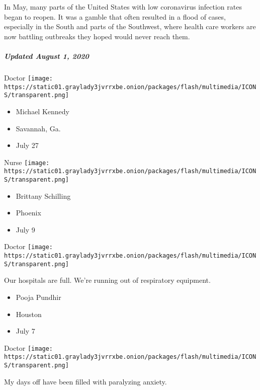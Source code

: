 In May, many parts of the United States with low coronavirus infection
rates began to reopen. It was a gamble that often resulted in a flood of
cases, especially in the South and parts of the Southwest, where health
care workers are now battling outbreaks they hoped would never reach
them.

\hypertarget{updated-august-1-2020}{%
\subparagraph{Updated August 1, 2020}\label{updated-august-1-2020}}

\protect\hyperlink{item-michael-kennedy}{}

Doctor
\texttt{[image: https://static01.graylady3jvrrxbe.onion/packages/flash/multimedia/ICONS/transparent.png]}

\begin{itemize}
\tightlist
\item
  Michael Kennedy
\item
  Savannah, Ga.
\item
  July 27
\end{itemize}

\protect\hyperlink{item-brittany-schilling}{}

Nurse
\texttt{[image: https://static01.graylady3jvrrxbe.onion/packages/flash/multimedia/ICONS/transparent.png]}

\begin{itemize}
\tightlist
\item
  Brittany Schilling
\item
  Phoenix
\item
  July 9
\end{itemize}

\protect\hyperlink{item-pooja-pundhir}{}

Doctor
\texttt{[image: https://static01.graylady3jvrrxbe.onion/packages/flash/multimedia/ICONS/transparent.png]}

Our hospitals are full. We're running out of respiratory equipment.

\begin{itemize}
\tightlist
\item
  Pooja Pundhir
\item
  Houston
\item
  July 7
\end{itemize}

\protect\hyperlink{item-kimberly-brown}{}

Doctor
\texttt{[image: https://static01.graylady3jvrrxbe.onion/packages/flash/multimedia/ICONS/transparent.png]}

My days off have been filled with paralyzing anxiety.

